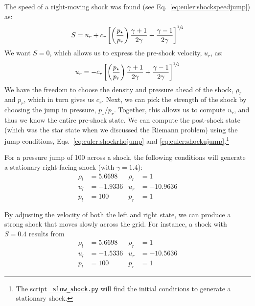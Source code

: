 The speed of a right-moving shock was found (see
Eq.~\ref{eq:euler:shockspeedjump}) as:
\begin{equation}
S = u_r + c_r \left [ \left ( \frac{p_\star}{p_r} \right ) \frac{\gamma+1}{2\gamma} + \frac{\gamma-1}{2\gamma} \right ]^{{\sfrac{1}{2}}}
\end{equation}
We want $S = 0$, which allows us to express the pre-shock velocity, $u_r$, as:
\begin{equation}
u_r = -c_r \left [ \left ( \frac{p_\star}{p_r} \right ) \frac{\gamma+1}{2\gamma} + \frac{\gamma-1}{2\gamma} \right ]^{{\sfrac{1}{2}}}
\end{equation}
We have the freedom to choose the density and pressure ahead of the
shock, $\rho_r$ and $p_r$, which in turn gives us $c_r$.  Next, we can
pick the strength of the shock by choosing the jump in pressure,
$p_\star/p_r$.  Together, this allows us to compute $u_r$, and thus we
know the entire pre-shock state.  We can compute the post-shock state
(which was the star state when we discussed the Riemann problem) using
the jump conditions, Eqs.~\ref{eq:euler:shockrhojump} and
\ref{eq:euler:shockujump}.\footnote{The script
  \href{https://github.com/zingale/hydro_examples/blob/master/compressible/slow_shock.py}{\tt
    slow\_shock.py} will find the initial conditions to generate a
  stationary shock.}

For a pressure jump of 100 across a shock, the following conditions will
generate a stationary right-facing shock (with $\gamma = 1.4$):
\begin{align}
\rho_l &= 5.6698      &  \rho_r &= 1 \nonumber \\
u_l   &= -1.9336      &  u_r    &= -10.9636   \\
p_l    &= 100         &  p_r    &= 1 \nonumber
\end{align}

By adjusting the velocity of both the left and right state, we can
produce a strong shock that moves slowly across the grid.  For
instance, a shock with $S = 0.4$ results from
\begin{align}
\rho_l &= 5.6698      &  \rho_r &= 1 \nonumber \\
u_l   &= -1.5336      &  u_r    &= -10.5636   \\
p_l    &= 100         &  p_r    &= 1 \nonumber
\end{align}

